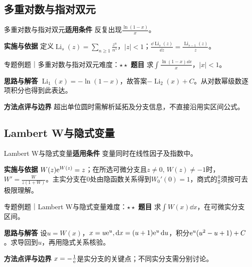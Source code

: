 \subsection{多重对数与指对双元}\label{mat:special_integrals:polylog}
\begin{method}{多重对数与指对双元}\textbf{适用条件} 反复出现$\frac{\ln(1-x)}{x}$。\par\textbf{实施与依据} 定义$\operatorname{Li}_s(z)=\sum_{n\ge1}\frac{z^n}{n^s}$，$|z|<1$；$\frac{\dd\operatorname{Li}_s(z)}{\dd z}=\frac{\operatorname{Li}_{s-1}(z)}{z}$。\end{method}
\begin{example}{专题例题｜多重对数与指对双元}{难度：$\star\star$}
\textbf{题目} 求$\int\frac{\ln(1-x)\dd x}{x}$，$|x|<1$。\par\textbf{思路与解答} $\operatorname{Li}_1(x)=-\ln(1-x)$，故答案$-\operatorname{Li}_2(x)+C$。从对数幂级数逐项积分也得到此表达。\par\textbf{方法点评与边界} 超出单位圆时需解析延拓及分支信息，不直接沿用实区间公式。
\end{example}
\subsection{Lambert W与隐式变量}\label{mat:special_integrals:lambert}
\begin{method}{Lambert W与隐式变量}\textbf{适用条件} 变量同时在线性因子及指数中。\par\textbf{实施与依据} $W(z)\mathrm{e}^{W(z)}=z$；在所选可微分支且$z\ne0,\,W(z)\ne-1$时，$W\prime=\frac{W}{z(1+W)}$。主实分支在0处由隐函数关系得到$W_0\prime(0)=1$，商式的$\frac{0}{0}$须按可去极限理解。\end{method}
\begin{example}{专题例题｜Lambert W与隐式变量}{难度：$\star\star$}
\textbf{题目} 求$\int W(x)\dd x$，在可微实分支区间。\par\textbf{思路与解答} 设$u=W(x)$，$x=u\mathrm{e}^u,\mathop{}\!\mathrm{d} x=(u+1)\mathrm{e}^u\mathop{}\!\mathrm{d} u$，积分$\mathrm{e}^u(u^2-u+1)+C$。求导回到$u$，再用隐式关系核验。\par\textbf{方法点评与边界} $x=-\frac{1}{\mathrm{e}}$是实分支的关键点；不同实分支需分别讨论。
\end{example}
